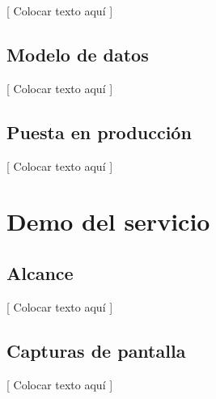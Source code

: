 \documentclass[oneside]{book}
\begin{document}
	[ Colocar texto aquí ]
\bigskip


\section{Modelo de datos}

	[ Colocar texto aquí ]
\bigskip


\section{Puesta en producción}

	[ Colocar texto aquí ]
\bigskip




%
%
\chapter{Demo del servicio}


\section{Alcance}

	[ Colocar texto aquí ]
\bigskip


\section{Capturas de pantalla}

	[ Colocar texto aquí ]
\bigskip







\end{document}
